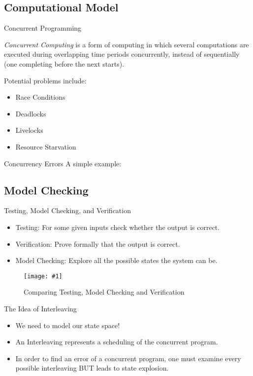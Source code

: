 \documentclass[9pt]{beamer}
\newcommand{\trace}[2]{
\begin{figure}[H]
\centering
\texttt{[image: \#1]}
\caption{#2}
\label{#2}
\end{figure}
}
\newcommand{\Code}[2]{
  \begin{minipage}{\linewidth}
  
  \label{#2}
  \end{minipage}
 }
\begin{document}
\subsection{Computational Model}
\begin{frame}{Concurrent Programming}

\emph{Concurrent Computing} is a form of computing in which several computations are executed during
overlapping time periods concurrently, instead of sequentially (one completing before the next starts).

Potential problems include:
\begin{itemize}
\item Race Conditions
\item Deadlocks
\item Livelocks
\item Resource Starvation
\end{itemize}

\end{frame}

\begin{frame}{Concurrency Errors}
A simple example:

\Code{../code/zero.c}{Example of non-concurrency error}

\Code{../code/zeroconc.c}{Example of concurrency error}

\end{frame}

\subsection{Model Checking}
\begin{frame}{Testing, Model Checking, and Verification}
\begin{itemize}
\item Testing: For some given inputs check whether the output is correct.
\item Verification: Prove formally that the output is correct.
\item Model Checking: Explore all the possible states the system can be.

\end{itemize}

\trace{../img/testmodver.png}{Comparing Testing, Model Checking and Verification}
    
\end{frame}

\begin{frame}{The Idea of Interleaving}

\begin{itemize}
    \item We need to model our state space!
    \item An Interleaving represents a scheduling of the concurrent program.
    \item In order to find an error of a concurrent program, one must examine every possible interleaving BUT leads to state explosion.
\end{itemize}
    

\end{frame}
\end{document}
